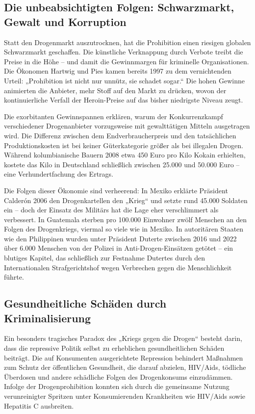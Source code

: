 \documentclass[11pt,a4paper]{article}
\begin{document}
	\subsection{Die unbeabsichtigten Folgen: Schwarzmarkt, Gewalt und Korruption}
	
	Statt den Drogenmarkt auszutrocknen, hat die Prohibition einen riesigen globalen Schwarzmarkt geschaffen.\cite{black-market} Die künstliche Verknappung durch Verbote treibt die Preise in die Höhe – und damit die Gewinnmargen für kriminelle Organisationen. Die Ökonomen Hartwig und Pies kamen bereits 1997 zu dem vernichtenden Urteil: „Prohibition ist nicht nur unnütz, sie schadet sogar.“\cite{spiegel-prohibition} Die hohen Gewinne animierten die Anbieter, mehr Stoff auf den Markt zu drücken, wovon der kontinuierliche Verfall der Heroin-Preise auf das bisher niedrigste Niveau zeugt.\cite{spiegel-prohibition}
	
	Die exorbitanten Gewinnspannen erklären, warum der Konkurrenzkampf verschiedener Drogenanbieter vorzugsweise mit gewalttätigen Mitteln ausgetragen wird.\cite{mexico-drug-war} Die Differenz zwischen dem Endverbraucherpreis und den tatsächlichen Produktionskosten ist bei keiner Güterkategorie größer als bei illegalen Drogen.\cite{mexico-drug-war} Während kolumbianische Bauern 2008 etwa 450 Euro pro Kilo Kokain erhielten, kostete das Kilo in Deutschland schließlich zwischen 25.000 und 50.000 Euro – eine Verhundertfachung des Ertrags.\cite{drug-war-failure}
	
	Die Folgen dieser Ökonomie sind verheerend: In Mexiko erklärte Präsident Calderón 2006 den Drogenkartellen den „Krieg“ und setzte rund 45.000 Soldaten ein – doch der Einsatz des Militärs hat die Lage eher verschlimmert als verbessert.\cite{mexico-drug-war} In Guatemala sterben pro 100.000 Einwohner zwölf Menschen an den Folgen des Drogenkriegs, viermal so viele wie in Mexiko.\cite{drug-war-failure} In autoritären Staaten wie den Philippinen wurden unter Präsident Duterte zwischen 2016 und 2022 über 6.000 Menschen von der Polizei in Anti-Drogen-Einsätzen getötet – ein blutiges Kapitel, das schließlich zur Festnahme Dutertes durch den Internationalen Strafgerichtshof wegen Verbrechen gegen die Menschlichkeit führte.\cite{philippines-drug-war}
	
	\subsection{Gesundheitliche Schäden durch Kriminalisierung}
	
	Ein besonders tragisches Paradox des „Kriegs gegen die Drogen“ besteht darin, dass die repressive Politik selbst zu erheblichen gesundheitlichen Schäden beiträgt. Die auf Konsumenten ausgerichtete Repression behindert Maßnahmen zum Schutz der öffentlichen Gesundheit, die darauf abzielen, HIV/Aids, tödliche Überdosen und andere schädliche Folgen des Drogenkonsums einzudämmen.\cite{nobis-failure} Infolge der Drogenprohibition konnten sich durch die gemeinsame Nutzung verunreinigter Spritzen unter Konsumierenden Krankheiten wie HIV/Aids sowie Hepatitis C ausbreiten.\cite{bpb-drug-control}
	
\end{document}
